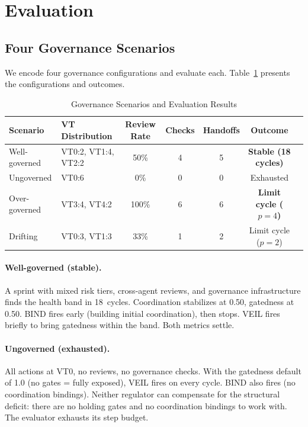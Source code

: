 \documentclass[sigconf,nonacm]{acmart}
\begin{document}
\section{Evaluation}\label{sec:eval}

\subsection{Four Governance Scenarios}

We encode four governance configurations and evaluate each.
Table~\ref{tab:scenarios} presents the configurations and outcomes.

\begin{table}[t]
  \caption{Governance Scenarios and Evaluation Results}\label{tab:scenarios}
  \small
  \begin{tabular}{@{}llccccl@{}}
    \toprule
    \textbf{Scenario} & \textbf{VT Distribution} & \textbf{Review Rate} & \textbf{Checks} & \textbf{Handoffs} & \textbf{Outcome} \\
    \midrule
    \rowcolor{cellgreen}
    Well-governed & VT0:2, VT1:4, VT2:2 & 50\% & 4 & 5 & \textbf{Stable (18 cycles)} \\
    Ungoverned & VT0:6 & 0\% & 0 & 0 & Exhausted \\
    \rowcolor{cellamber}
    Over-governed & VT3:4, VT4:2 & 100\% & 6 & 6 & \textbf{Limit cycle ($p{=}4$)} \\
    Drifting & VT0:3, VT1:3 & 33\% & 1 & 2 & Limit cycle ($p{=}2$) \\
    \bottomrule
  \end{tabular}
\end{table}

\paragraph{Well-governed (stable).}
A sprint with mixed risk tiers, cross-agent reviews, and governance
infrastructure finds the health band in 18~cycles. Coordination stabilizes
at 0.50, gatedness at 0.50. BIND fires early (building initial
coordination), then stops. VEIL fires briefly to bring gatedness within
the band. Both metrics settle.

\paragraph{Ungoverned (exhausted).}
All actions at VT0, no reviews, no governance checks. With the gatedness
default of 1.0 (no gates = fully exposed), VEIL fires on every cycle.
BIND also fires (no coordination bindings). Neither regulator can
compensate for the structural deficit: there are no holding gates and no
coordination bindings to work with. The evaluator exhausts its step budget.
\end{document}
